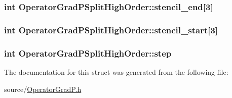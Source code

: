 \subsubsection[{stencil\+\_\+end}]{\setlength{\rightskip}{0pt plus 5cm}int Operator\+Grad\+P\+Split\+High\+Order\+::stencil\+\_\+end\mbox{[}3\mbox{]}}\label{struct_operator_grad_p_split_high_order_a2b1fb9ec48235dc12d35d815661b3a1d}
\hypertarget{struct_operator_grad_p_split_high_order_a2493fb5fd44419dce1219201fe62120b}{}
\subsubsection[{stencil\+\_\+start}]{\setlength{\rightskip}{0pt plus 5cm}int Operator\+Grad\+P\+Split\+High\+Order\+::stencil\+\_\+start\mbox{[}3\mbox{]}}\label{struct_operator_grad_p_split_high_order_a2493fb5fd44419dce1219201fe62120b}
\hypertarget{struct_operator_grad_p_split_high_order_a6fff9a66cc8526d52c945a95ab49668b}{}
\subsubsection[{step}]{\setlength{\rightskip}{0pt plus 5cm}int Operator\+Grad\+P\+Split\+High\+Order\+::step}\label{struct_operator_grad_p_split_high_order_a6fff9a66cc8526d52c945a95ab49668b}


The documentation for this struct was generated from the following file\+:\begin{DoxyCompactItemize}
\item 
source/\hyperlink{_operator_grad_p_8h}{Operator\+Grad\+P.\+h}\end{DoxyCompactItemize}
